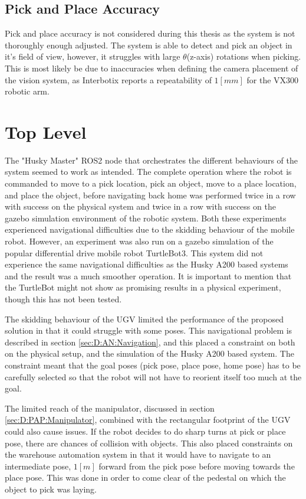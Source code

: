 \subsection{Pick and Place Accuracy}
Pick and place accuracy is not considered during this thesis as the system is not thoroughly enough adjusted. The system is able to detect and pick an object in it's field of view, however, it struggles with large $\theta$(z-axis) rotations when picking. This is most likely be due to inaccuracies when defining the camera placement of the vision system, as Interbotix reports a repeatability of $1[mm]$ for the VX300 robotic arm\cite{interbotix_vx300}. 


\section{Top Level} \label{sec:D:TopLevel}
The "Husky Master" ROS2 node that orchestrates the different behaviours of the system seemed to work as intended. The complete operation where the robot is commanded to move to a pick location, pick an object, move to a place location, and place the object, before navigating back home was performed twice in a row with success on the physical system and twice in a row with success on the gazebo simulation environment of the robotic system. Both these experiments experienced navigational difficulties due to the skidding behaviour of the mobile robot. However, an experiment was also run on a gazebo simulation of the popular differential drive mobile robot TurtleBot3. This system did not experience the same navigational difficulties as the Husky A200 based systems and the result was a much smoother operation. It is important to mention that the TurtleBot might not show as promising results in a physical experiment, though this has not been tested.

The skidding behaviour of the UGV limited the performance of the proposed solution in that it could struggle with some poses. This navigational problem is described in section \ref{sec:D:AN:Navigation}, and this placed a constraint on both on the physical setup, and the simulation of the Husky A200 based system. The constraint meant that the goal poses (pick pose, place pose, home pose) has to be carefully selected so that the robot will not have to reorient itself too much at the goal.

The limited reach of the manipulator, discussed in section \ref{sec:D:PAP:Manipulator}, combined with the rectangular footprint of the UGV could also cause issues. If the robot decides to do sharp turns at pick or place pose, there are chances of collision with objects. This also placed constraints on the warehouse automation system in that it would have to navigate to an intermediate pose, $1[m]$ forward from the pick pose before moving towards the place pose. This was done in order to come clear of the pedestal on which the object to pick was laying.


